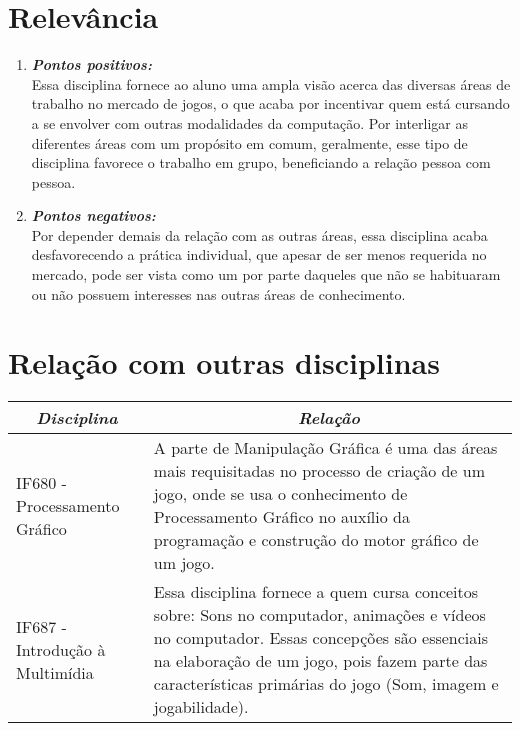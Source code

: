 \documentclass[10pt]{article}
\begin{document}
\section{Relevância}
\begin{enumerate}
    \item \textbf\textit {\textbf{Pontos positivos:}}
    \\ Essa disciplina fornece ao aluno uma ampla visão acerca das diversas áreas de trabalho no mercado de jogos, o que acaba por incentivar quem está cursando a se envolver com outras modalidades da computação. Por interligar as diferentes áreas com um propósito em comum, geralmente, esse tipo de disciplina favorece o trabalho em grupo, beneficiando a relação pessoa com pessoa.
    \item \textbf\textit {\textbf{Pontos negativos:}}
    \\ Por depender demais da relação com as outras áreas, essa disciplina acaba desfavorecendo a prática individual, que apesar de ser menos requerida no mercado, pode ser vista como um  por parte daqueles que não se habituaram ou não possuem interesses nas outras áreas de conhecimento.
\end{enumerate}

\section{Relação com outras disciplinas}

\begin{table}[htbp]
\centering
\begin{tabularx}{\linewidth}{|l|X|}
\hline
\multicolumn{1}{|c|}{\textit{\textbf{Disciplina}}} & \multicolumn{1}{c|}{\textit{\textbf{Relação}}}  \tabularnewline \hline
IF680 - Processamento Gráfico \citep{pgcin} & A parte de Manipulação Gráfica é uma das áreas mais requisitadas no processo de criação de um jogo, onde se usa o conhecimento de Processamento Gráfico no auxílio da programação e construção do motor gráfico de um jogo. \tabularnewline \hline    
IF687 - Introdução à Multimídia \citep{imcin} & Essa disciplina fornece a quem cursa conceitos sobre: Sons no computador, animações e vídeos no computador. Essas concepções são essenciais na elaboração de um jogo, pois fazem parte das características primárias do jogo (Som, imagem e jogabilidade).\tabularnewline \hline 
\end{tabularx}
\label{table:compa}   
\end{table}



\end{document}
